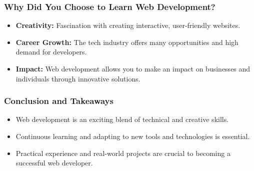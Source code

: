 \documentclass{beamer}
\begin{document}
\begin{frame}
  \frametitle{Why Did You Choose to Learn Web Development?}
  \begin{itemize}
    \item \textbf{Creativity:} Fascination with creating interactive, user-friendly websites.
    \item \textbf{Career Growth:} The tech industry offers many opportunities and high demand for developers.
    \item \textbf{Impact:} Web development allows you to make an impact on businesses and individuals through innovative solutions.
  \end{itemize}
  \vspace{0.5cm}
  
\end{frame}

\begin{frame}
  \frametitle{Conclusion and Takeaways}
  \begin{itemize}
    \item Web development is an exciting blend of technical and creative skills.
    \item Continuous learning and adapting to new tools and technologies is essential.
    \item Practical experience and real-world projects are crucial to becoming a successful web developer.
  \end{itemize}
  \vspace{0.5cm}
  
\end{frame}
\end{document}
